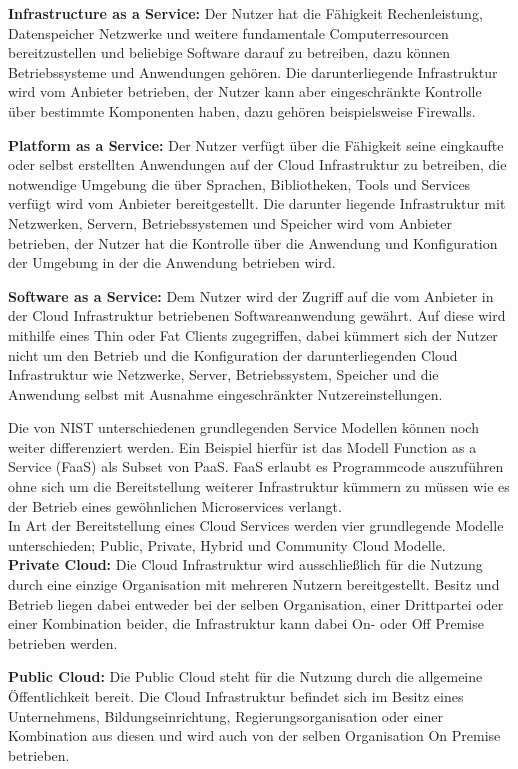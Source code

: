 \textbf{Infrastructure as a Service:} Der Nutzer hat die Fähigkeit Rechenleistung, Datenspeicher
Netzwerke und weitere fundamentale Computerresourcen bereitzustellen und beliebige Software
darauf zu betreiben, dazu können Betriebssysteme und Anwendungen gehören. Die
darunterliegende Infrastruktur wird vom Anbieter betrieben, der Nutzer  kann aber
eingeschränkte Kontrolle über bestimmte Komponenten haben, dazu gehören beispielsweise
Firewalls.

\textbf{Platform as a Service:} Der Nutzer verfügt über die Fähigkeit seine eingkaufte oder
selbst erstellten Anwendungen auf der Cloud Infrastruktur zu betreiben, die notwendige
Umgebung die über Sprachen, Bibliotheken, Tools und Services verfügt wird vom Anbieter
bereitgestellt. Die darunter liegende Infrastruktur mit Netzwerken, Servern,
Betriebssystemen und Speicher wird vom Anbieter betrieben, der Nutzer hat die Kontrolle
über die Anwendung und Konfiguration der Umgebung in der die Anwendung betrieben wird.

\textbf{Software as a Service:} Dem Nutzer wird der Zugriff auf die vom Anbieter in der
Cloud Infrastruktur betriebenen Softwareanwendung gewährt. Auf diese wird mithilfe
eines Thin oder Fat Clients zugegriffen, dabei kümmert sich der Nutzer nicht um den
Betrieb und die Konfiguration der darunterliegenden Cloud Infrastruktur wie
Netzwerke, Server, Betriebssystem, Speicher und die Anwendung selbst mit Ausnahme
eingeschränkter Nutzereinstellungen.

Die von NIST unterschiedenen grundlegenden Service Modellen können noch weiter
differenziert werden.
Ein Beispiel hierfür ist das Modell Function as a Service (FaaS) als Subset von PaaS.
FaaS erlaubt es Programmcode auszuführen ohne sich um die Bereitstellung weiterer 
Infrastruktur kümmern zu müssen wie es der Betrieb eines gewöhnlichen Microservices
verlangt.\\

In Art der Bereitstellung eines Cloud Services werden vier grundlegende Modelle
unterschieden; Public, Private, Hybrid und Community Cloud Modelle.\\

\textbf{Private Cloud:} Die Cloud Infrastruktur wird ausschließlich für die Nutzung durch eine einzige
Organisation mit mehreren Nutzern bereitgestellt. Besitz und Betrieb liegen dabei
entweder bei der selben Organisation, einer Drittpartei oder einer Kombination beider, 
die Infrastruktur kann dabei On- oder Off Premise betrieben werden.

\textbf{Public Cloud:} Die Public Cloud steht für die Nutzung durch die allgemeine Öffentlichkeit bereit.
Die Cloud Infrastruktur befindet sich im Besitz eines Unternehmens, Bildungseinrichtung,
Regierungsorganisation oder einer Kombination aus diesen und wird auch von der selben
Organisation On Premise betrieben. 

